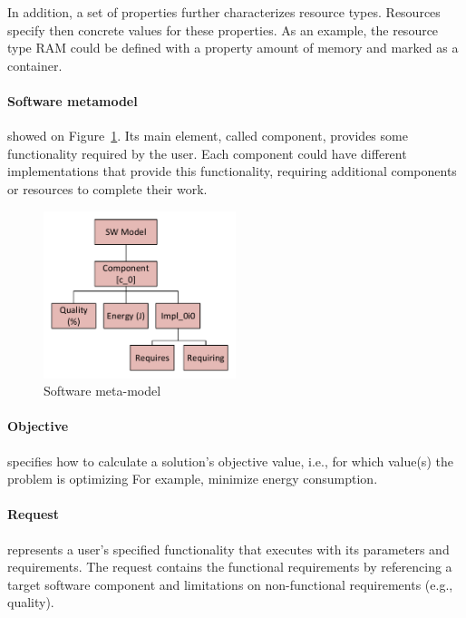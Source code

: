 In addition, a set of properties further characterizes resource types. Resources specify then concrete values for these properties. As an example, the resource type RAM could be defined with a property amount of memory and marked as a container.

\paragraph{Software metamodel} showed on Figure~\ref{fig:SWModel}. Its main element, called component, provides some functionality required by the user.
Each component could have different implementations that provide this functionality, requiring additional components or resources to complete their work. 

\begin{figure}
	\centering
	\includegraphics[width=0.5\textwidth]{images/SWModel.pdf}
	\caption[Software meta-model]{Software meta-model}
	\label{fig:SWModel}
\end{figure}

\paragraph{Objective} specifies how to calculate a solution's objective value, i.e., for which value(s) the problem is optimizing For example, minimize energy consumption.

\paragraph{Request} represents a user's specified functionality that executes with its parameters and requirements.  The request contains the functional requirements by referencing a target software component and limitations on non-functional requirements (e.g., quality).\\


